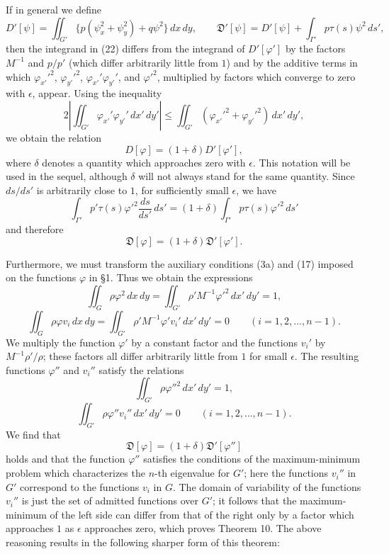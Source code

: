 If in general we define
\[
D'[\psi]=\iint_{G'}\{p(\psi_x^2+\psi_y^2)+q\psi^2\}\,dx\,dy,
\qquad
\mathfrak D'[\psi]=D'[\psi]+\int_{\Gamma'}p\tau(s)\psi^2\,ds',
\]
then the integrand in (22) differs from the integrand of $D'[\varphi']$ by the factors $M^{-1}$ and $p/p'$ (which differ arbitrarily little from $1$) and by the additive terms in which $\varphi_{x'}'^2$, $\varphi_{y'}'^2$, $\varphi_{x'}'\varphi_{y'}'$, and $\varphi'^2$, multiplied by factors which converge to zero with $\epsilon$, appear. Using the inequality
\[
2\left|\iint_{G'}\varphi_{x'}'\varphi_{y'}'\,dx'\,dy'\right|
\le\iint_{G'}(\varphi_{x'}'^2+\varphi_{y'}'^2)\,dx'\,dy',
\]
we obtain the relation
\[
D[\varphi]=(1+\delta)D'[\varphi'],
\]
where $\delta$ denotes a quantity which approaches zero with $\epsilon$. This notation will be used in the sequel, although $\delta$ will not always stand for the same quantity. Since $ds/ds'$ is arbitrarily close to $1$, for sufficiently small $\epsilon$, we have
\[
\int_{\Gamma'}p'\tau(s)\varphi'^2\frac{ds}{ds'}\,ds'
=(1+\delta)\int_{\Gamma'}p\tau(s)\varphi'^2\,ds'
\]
and therefore
\[
\mathfrak D[\varphi]=(1+\delta)\mathfrak D'[\varphi'].
\]

Furthermore, we must transform the auxiliary conditions (3a) and (17) imposed on the functions $\varphi$ in \S1. Thus we obtain the expressions
\[
\iint_G\rho\varphi^2\,dx\,dy
=\iint_{G'}\rho'M^{-1}\varphi'^2\,dx'\,dy'=1,
\]
\[
\iint_G\rho\varphi v_i\,dx\,dy
=\iint_{G'}\rho'M^{-1}\varphi'v_i'\,dx'\,dy'=0
\qquad(i=1,2,\ldots,n-1).
\]
We multiply the function $\varphi'$ by a constant factor and the functions $v_i'$ by $M^{-1}\rho'/\rho$; these factors all differ arbitrarily little from $1$ for small $\epsilon$. The resulting functions $\varphi''$ and $v_i''$ satisfy the relations
\[
\iint_{G'}\rho\varphi''^2\,dx'\,dy'=1,
\]
\[
\iint_{G'}\rho\varphi''v_i''\,dx'\,dy'=0
\qquad(i=1,2,\ldots,n-1).
\]
We find that
\[
\mathfrak D[\varphi]=(1+\delta)\mathfrak D'[\varphi'']
\]
holds and that the function $\varphi''$ satisfies the conditions of the maximum-minimum problem which characterizes the $n$-th eigenvalue for $G'$; here the functions $v_i''$ in $G'$ correspond to the functions $v_i$ in $G$. The domain of variability of the functions $v_i''$ is just the set of admitted functions over $G'$; it follows that the maximum-minimum of the left side can differ from that of the right only by a factor which approaches $1$ as $\epsilon$ approaches zero, which proves Theorem 10. The above reasoning results in the following sharper form of this theorem:

